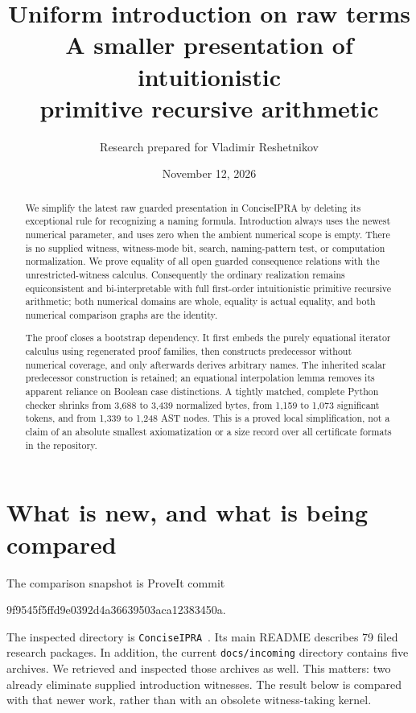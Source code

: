 \documentclass[11pt]{article}
\title{Uniform introduction on raw terms\large\\A smaller presentation of intuitionistic\\primitive recursive arithmetic}
\author{Research prepared for Vladimir Reshetnikov}
\date{November 12, 2026}
\theoremstyle{definition}\newtheorem{definition}[theorem]{Definition}
\theoremstyle{remark}\newtheorem{remark}[theorem]{Remark}
\newcommand{\code}[1]{\texttt{#1}}
\begin{document}
\maketitle
\begin{abstract}
We simplify the latest raw guarded presentation in ConciseIPRA by deleting
its exceptional rule for recognizing a naming formula. Introduction always
uses the newest numerical parameter, and uses zero when the ambient
numerical scope is empty. There is no supplied witness, witness-mode bit,
search, naming-pattern test, or computation normalization. We prove equality
of all open guarded consequence relations with the unrestricted-witness
calculus. Consequently the ordinary realization remains equiconsistent and
bi-interpretable with full first-order intuitionistic primitive recursive
arithmetic; both numerical domains are whole, equality is actual equality,
and both numerical comparison graphs are the identity.

The proof closes a bootstrap dependency. It first embeds the purely
equational iterator calculus using regenerated proof families, then
constructs predecessor without numerical coverage, and only afterwards
derives arbitrary names. The inherited scalar predecessor construction is
retained; an equational interpolation lemma removes its apparent reliance
on Boolean case distinctions. A tightly matched, complete Python checker
shrinks from 3,688 to 3,439 normalized bytes, from 1,159 to 1,073 significant
tokens, and from 1,339 to 1,248 AST nodes. This is a proved local
simplification, not a claim of an absolute smallest axiomatization or a
size record over all certificate formats in the repository.
\end{abstract}

\section{What is new, and what is being compared}
\label{sec:comparison}

The comparison snapshot is ProveIt commit
\begin{center}\small\ttfamily
9f9545f5ffd9e0392d4a36639503aca12383450a.
\end{center}
The inspected directory is \code{ConciseIPRA}~\cite{repo}.
Its main README describes 79 filed research packages. In addition, the
current \code{docs/incoming} directory contains five archives. We retrieved
and inspected those archives as well. This matters: two already eliminate
supplied introduction witnesses. The result below is compared with that
newer work, rather than with an obsolete witness-taking kernel.
\end{document}
